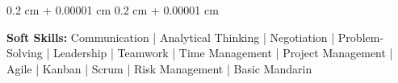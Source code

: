 \documentclass[10pt, letterpaper]{article}
\newenvironment{onecolentry}{
    \begin{adjustwidth}{
        0.2 cm + 0.00001 cm
    }{
        0.2 cm + 0.00001 cm
    }
}{
    \end{adjustwidth}
} %
\begin{document}
        \vspace{0.2 cm}

        \begin{onecolentry}
            \textbf{Soft Skills:} Communication | Analytical Thinking | Negotiation | Problem-Solving | Leadership | Teamwork | Time Management | Project Management | Agile | Kanban | Scrum | Risk Management | Basic Mandarin
        \end{onecolentry}


    
\end{document}
